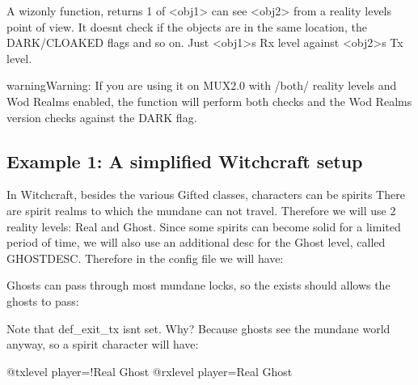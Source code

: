 \documentclass[letterpaper,10pt,english]{sphinxmanual}
\begin{document}
\sphinxAtStartPar
A wiz\sphinxhyphen{}only function, returns 1 of \textless{}obj1\textgreater{} can see \textless{}obj2\textgreater{} from a reality
levels point of view. It doesn\textquotesingle{}t check if the objects are in the same
location, the DARK/CLOAKED flags and so on. Just \textless{}obj1\textgreater{}\textquotesingle{}s Rx level against
\textless{}obj2\textgreater{}\textquotesingle{}s Tx level.

\begin{sphinxadmonition}{warning}{Warning:}
\sphinxAtStartPar
If you are using it on MUX2.0 with /both/ reality levels and Wod
Realms enabled, the function will perform both checks and the Wod Realms
version checks against the DARK flag.
\end{sphinxadmonition}


\subsection{Example 1: A simplified Witchcraft setup}
\label{\detokenize{advanced:example-1-a-simplified-witchcraft-setup}}
\sphinxAtStartPar
In Witchcraft, besides the various Gifted classes, characters can be spirits
There are spirit realms to which the mundane can not travel. Therefore we
will use 2 reality levels: Real and Ghost. Since some spirits can become
solid for a limited period of time, we will also use an additional desc for
the Ghost level, called GHOSTDESC. Therefore in the config file we will
have:

\begin{sphinxVerbatim}[commandchars=\\\{\}]
  
   
\end{sphinxVerbatim}

\sphinxAtStartPar
Ghosts can pass through most mundane locks, so the exists should allows the
ghosts to pass:

\begin{sphinxVerbatim}[commandchars=\\\{\}]
 
\end{sphinxVerbatim}

\sphinxAtStartPar
Note that def\_exit\_tx isn\textquotesingle{}t set. Why? Because ghosts see the mundane world
anyway, so a spirit character will have:

\begin{sphinxVerbatim}[commandchars=\\\{\}]
@txlevel \PYGZlt{}player\PYGZgt{}=!Real Ghost
@rxlevel \PYGZlt{}player\PYGZgt{}=Real Ghost
\end{sphinxVerbatim}
\end{document}
